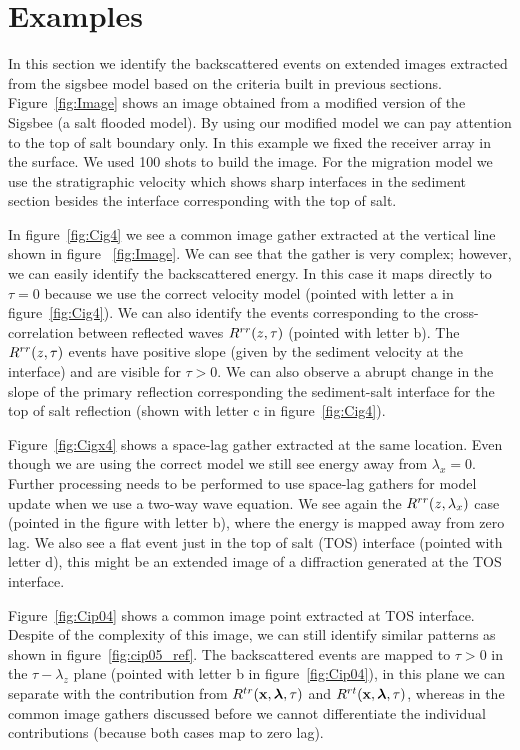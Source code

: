 \section{Examples}

In this section we identify the backscattered events on extended images extracted from the sigsbee model based on
the criteria built in previous sections. Figure~\ref{fig:Image} shows an image obtained from  a modified
version of the Sigsbee (a salt flooded model). By using our modified model we can pay attention to the top
of salt boundary only. In this example we fixed the receiver array in the surface. We used 100 shots to build 
the image. For the migration model we use the stratigraphic
velocity which shows sharp interfaces in the sediment section besides the interface corresponding with the top of salt.

In figure~\ref{fig:Cig4} we see a common image gather extracted at the vertical line shown in figure ~\ref{fig:Image}.
We can see that the gather is very complex; however, we can easily identify the backscattered energy. In this
case it maps directly to $\tau=0$ because we use the correct velocity model (pointed with letter a in figure~\ref{fig:Cig4}).
We can also identify the events corresponding to the cross-correlation between reflected waves $R^{rr}(z,\tau)$ (pointed
with letter b). The $R^{rr}(z,\tau)$ events have positive slope (given by the sediment velocity at the interface) and are 
visible for $\tau>0$. We can also observe a abrupt change
in the slope of the primary reflection corresponding the sediment-salt interface for the top of salt reflection (shown with
letter c in figure~\ref{fig:Cig4}).

Figure~\ref{fig:Cigx4} shows a space-lag gather extracted at the same location. Even though we are using the correct model 
we still see energy away from $\lambda_x=0$. Further processing needs to be performed to use space-lag gathers for model update
when we use a two-way wave equation. We see again the $R^{rr}(z,\lambda_x)$ case (pointed in the figure with letter b), 
where the energy is mapped away from zero lag.  We also see a flat event just in the
top of salt (TOS) interface (pointed with letter d), this might be an extended image of a diffraction generated at the TOS interface.

Figure~\ref{fig:Cip04} shows a common image point extracted at TOS interface. Despite of the complexity of this image, we can still
identify similar patterns as shown in figure~\ref{fig:cip05_ref}. The backscattered events are mapped to $\tau>0$ in the
$\tau-\lambda_z$ plane (pointed with letter b in figure~\ref{fig:Cip04}), in this plane we can separate with the contribution 
from $R^{tr}({\bf x},{\boldsymbol{\lambda}},\tau)$ and $R^{rt}({\bf x},{\boldsymbol{\lambda}},\tau)$, whereas in the common image gathers discussed before  we cannot differentiate the individual
contributions (because both cases map to zero lag).

